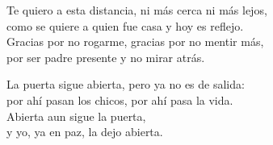 \begin{lyrics}
Te quiero a esta distancia, ni más cerca ni más lejos,\\
como se quiere a quien fue casa y hoy es reflejo.\\
Gracias por no rogarme, gracias por no mentir más,\\
por ser padre presente y no mirar atrás.

La puerta sigue abierta, pero ya no es de salida:\\
por ahí pasan los chicos, por ahí pasa la vida.\\
Abierta aun sigue la puerta,\\
y yo, ya en paz, la dejo abierta.
\end{lyrics}
